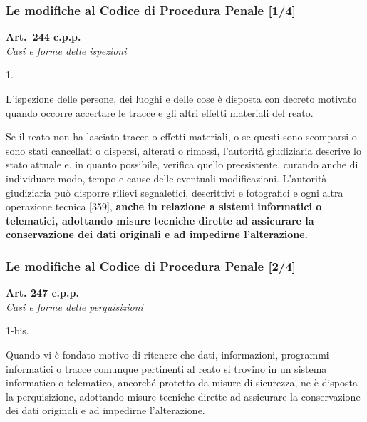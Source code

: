 \documentclass[11pt]{beamer}
\begin{document}
	\begin{frame}
		\frametitle{Le modifiche al Codice di Procedura Penale [1/4]}
		\fontsize{8pt}{\baselineskip}\selectfont
		\begin{center}
			\textbf{Art.~244 c.p.p.} \\\textit{Casi e forme delle ispezioni}	
		\end{center}		
			\begin{labeling}{1.}
				\item[1.] L'ispezione delle persone, dei luoghi e delle cose è disposta con decreto motivato quando occorre accertare le tracce e gli altri effetti materiali del reato.
				\item[2.] Se il reato non ha lasciato tracce o effetti materiali, o se questi sono scomparsi o sono stati cancellati o dispersi, alterati o rimossi, l'autorità giudiziaria descrive lo stato attuale e, in quanto possibile, verifica quello preesistente, curando anche di individuare modo, tempo e cause delle eventuali modificazioni. L'autorità giudiziaria può disporre rilievi segnaletici, descrittivi e fotografici e ogni altra operazione tecnica [359], \textbf{anche in relazione a sistemi informatici o telematici, adottando misure tecniche dirette ad assicurare la conservazione dei dati originali e ad impedirne l'alterazione.}
			\end{labeling}
	\end{frame}
	\begin{frame}
		\frametitle{Le modifiche al Codice di Procedura Penale [2/4]}
		\fontsize{8pt}{\baselineskip}\selectfont
			\begin{center}
				\textbf{Art. 247 c.p.p.} \\\textit{Casi e forme delle perquisizioni}
			\end{center}
			\begin{labeling}{1-bis.}
				\item[ \textellipsis ]
				\item[1-bis.] Quando vi è fondato motivo di ritenere che dati, informazioni, programmi informatici o tracce comunque pertinenti al reato si trovino in un sistema informatico o telematico, ancorché protetto da misure di sicurezza, ne è disposta la perquisizione, adottando misure tecniche dirette ad assicurare la conservazione dei dati originali e ad impedirne l'alterazione.
				\item[\textellipsis]
			\end{labeling}
	\end{frame}
\end{document}
